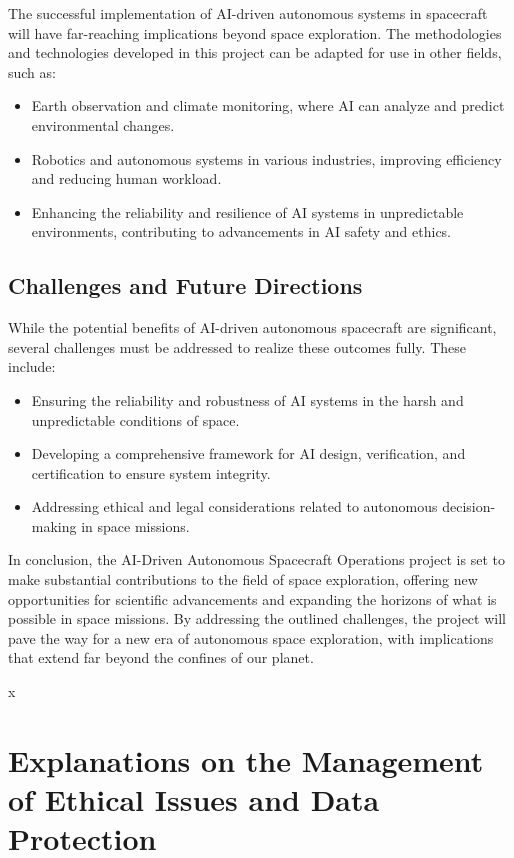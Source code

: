\documentclass[a4paper,12pt]{article}
\begin{document}
The successful implementation of AI-driven autonomous systems in spacecraft will have far-reaching implications beyond space exploration. The methodologies and technologies developed in this project can be adapted for use in other fields, such as:

\begin{itemize}
    \item Earth observation and climate monitoring, where AI can analyze and predict environmental changes.
    \item Robotics and autonomous systems in various industries, improving efficiency and reducing human workload.
    \item Enhancing the reliability and resilience of AI systems in unpredictable environments, contributing to advancements in AI safety and ethics.
\end{itemize}

\subsection{Challenges and Future Directions}

While the potential benefits of AI-driven autonomous spacecraft are significant, several challenges must be addressed to realize these outcomes fully. These include:

\begin{itemize}
    \item Ensuring the reliability and robustness of AI systems in the harsh and unpredictable conditions of space.
    \item Developing a comprehensive framework for AI design, verification, and certification to ensure system integrity.
    \item Addressing ethical and legal considerations related to autonomous decision-making in space missions.
\end{itemize}

In conclusion, the AI-Driven Autonomous Spacecraft Operations project is set to make substantial contributions to the field of space exploration, offering new opportunities for scientific advancements and expanding the horizons of what is possible in space missions. By addressing the outlined challenges, the project will pave the way for a new era of autonomous space exploration, with implications that extend far beyond the confines of our planet.



x
\section{Explanations on the Management of Ethical Issues and Data Protection}
\end{document}

